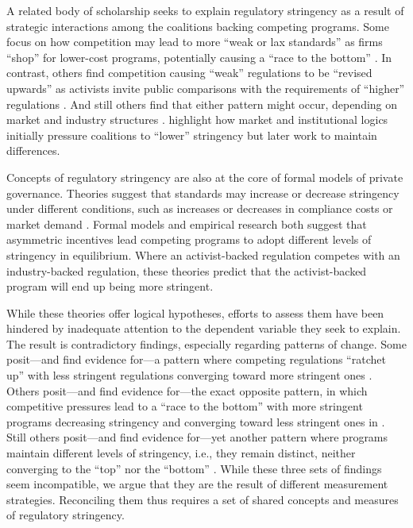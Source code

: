 \documentclass[
      12pt,
            Review ]{article}
\begin{document}
A related body of scholarship seeks to explain regulatory stringency as a result of strategic interactions among the coalitions backing competing programs. Some focus on how competition may lead to more ``weak or lax standards'' as firms ``shop'' for lower-cost programs, potentially causing a ``race to the bottom'' \citep{Abbott2010, Fransen2011, Gulbrandsen2004}. In contrast, others find competition causing ``weak'' regulations to be ``revised upwards'' as activists invite public comparisons with the requirements of ``higher'' regulations \citep{Overdevest2005, Overdevest2010}. And still others find that either pattern might occur, depending on market and industry structures \citep{Cashore2004, Hassel2008, VanderVen2015}. \citet{Cashore2004} highlight how market and institutional logics initially pressure coalitions to ``lower'' stringency but later work to maintain differences.

Concepts of regulatory stringency are also at the core of formal models of private governance. Theories suggest that standards may increase or decrease stringency under different conditions, such as increases or decreases in compliance costs or market demand \citep{Abderrazak2009, Fischer2014}. Formal models \citep{Fischer2014, Li2015, Poret2016} and empirical research \citep{Cashore2004} both suggest that asymmetric incentives lead competing programs to adopt different levels of stringency in equilibrium. Where an activist-backed regulation competes with an industry-backed regulation, these theories predict that the activist-backed program will end up being more stringent.

While these theories offer logical hypotheses, efforts to assess them have been hindered by inadequate attention to the dependent variable they seek to explain. The result is contradictory findings, especially regarding patterns of change. Some posit---and find evidence for---a pattern where competing regulations ``ratchet up'' with less stringent regulations converging toward more stringent ones \citep{Overdevest2005, Overdevest2010, Overdevest2014}. Others posit---and find evidence for---the exact opposite pattern, in which competitive pressures lead to a ``race to the bottom'' with more stringent programs decreasing stringency and converging toward less stringent ones in \citep{Abbott2010, Fransen2011, Gulbrandsen2004}. Still others posit---and find evidence for---yet another pattern where programs maintain different levels of stringency, i.e., they remain distinct, neither converging to the ``top'' nor the ``bottom'' \citep{Cashore2004}. While these three sets of findings seem incompatible, we argue that they are the result of different measurement strategies. Reconciling them thus requires a set of shared concepts and measures of regulatory stringency.
\end{document}
